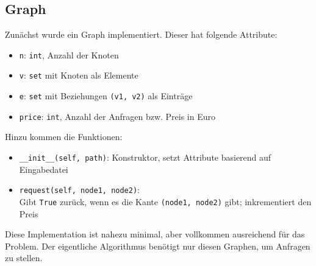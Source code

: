 \documentclass[a4paper,10pt,ngerman]{scrartcl}
\begin{document}
\subsection{Graph}
Zun\"achst wurde ein Graph implementiert. Dieser hat folgende Attribute:
\begin{itemize}
  \item \texttt{n}: \texttt{int}, Anzahl der Knoten 
  \item \texttt{v}: \texttt{set} mit Knoten als Elemente
  \item \texttt{e}: \texttt{set} mit Beziehungen \texttt{(v1, v2)} als Eintr\"age
  \item \texttt{price}: \texttt{int}, Anzahl der Anfragen bzw. Preis in Euro
\end{itemize} Hinzu kommen die Funktionen: 
\begin{itemize}
  \item \texttt{\_\_init\_\_(self, path)}: Konstruktor, setzt Attribute basierend auf Eingabedatei
  \item \texttt{request(self, node1, node2)}:\\ Gibt \texttt{True} zur\"uck, wenn es die Kante 
        \texttt{(node1, node2)} gibt; inkrementiert den Preis
\end{itemize}
Diese Implementation ist nahezu minimal, aber vollkommen ausreichend f\"ur das Problem.
Der eigentliche Algorithmus ben\"otigt nur diesen Graphen, um Anfragen zu stellen.
\end{document}
